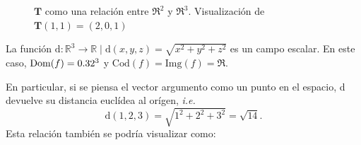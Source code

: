 \begin{example}
\begin{figure}[H]
\begin{center}
   \caption{$\mathbf{T}$ como una relación entre $\Re^2$ y $\Re^3$. Visualización de $\mathbf{T}(1,1)=(2,0,1)$}
   \end{center}
 \end{figure}

\end{example}

\begin{example}
        La función $\text{d}:\mathbb{R}^3 \rightarrow \mathbb{R} \;|\; \text{d}(x,y,z) = \sqrt{x^2+y^2+z^2}$
        es un campo escalar. En este caso, $\text{Dom}(f)=0.32^3$ y $\text{Cod}(f)=\text{Img}(f)=\Re$. 

          En particular, si se piensa el vector argumento como un punto en el espacio, d devuelve su distancia eucl\'idea al orígen, \textit{i.e.}
          \begin{equation*}
              \text{d}(1,2,3)=\sqrt{1^2+2^2+3^2}=\sqrt{14}.
          \end{equation*}
          \label{ej:campoEscalar}
        Esta relación también se podría visualizar como:
        \begin{figure}[H]
          \begin{center}
\end{center}
\end{figure}
\end{example}
